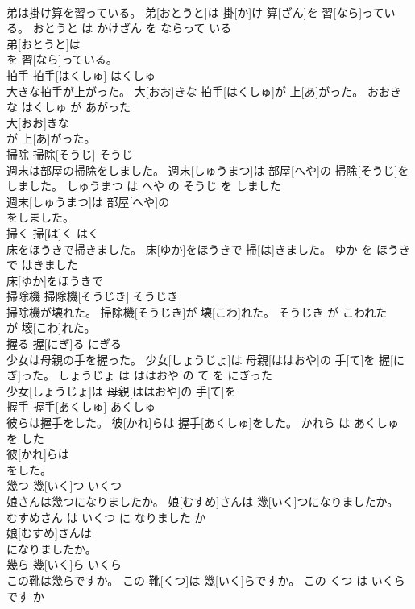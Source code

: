 \documentclass[8pt]{extreport}
\begin{document}
\begin{CJK}{UTF8}{min}
\\	弟は掛け算を習っている。	弟[おとうと]は 掛[か]け 算[ざん]を 習[なら]っている。	おとうと は かけざん を ならって いる	
\\	弟[おとうと]は
\\	を 習[なら]っている。			
\\	拍手	拍手[はくしゅ]	はくしゅ	
\\	大きな拍手が上がった。	大[おお]きな 拍手[はくしゅ]が 上[あ]がった。	おおき な はくしゅ が あがった	
\\	大[おお]きな
\\	が 上[あ]がった。			
\\	掃除	掃除[そうじ]	そうじ	
\\	週末は部屋の掃除をしました。	週末[しゅうまつ]は 部屋[へや]の 掃除[そうじ]をしました。	しゅうまつ は へや の そうじ を しました	
\\	週末[しゅうまつ]は 部屋[へや]の
\\	をしました。			
\\	掃く	掃[は]く	はく	
\\	床をほうきで掃きました。	床[ゆか]をほうきで 掃[は]きました。	ゆか を ほうき で はきました	
\\	床[ゆか]をほうきで
\\	掃除機	掃除機[そうじき]	そうじき	
\\	掃除機が壊れた。	掃除機[そうじき]が 壊[こわ]れた。	そうじき が こわれた	
\\	が 壊[こわ]れた。			
\\	握る	握[にぎ]る	にぎる	
\\	少女は母親の手を握った。	少女[しょうじょ]は 母親[ははおや]の 手[て]を 握[にぎ]った。	しょうじょ は ははおや の て を にぎった	
\\	少女[しょうじょ]は 母親[ははおや]の 手[て]を
\\	握手	握手[あくしゅ]	あくしゅ	
\\	彼らは握手をした。	彼[かれ]らは 握手[あくしゅ]をした。	かれら は あくしゅ を した	
\\	彼[かれ]らは
\\	をした。			
\\	幾つ	幾[いく]つ	いくつ	
\\	娘さんは幾つになりましたか。	娘[むすめ]さんは 幾[いく]つになりましたか。	むすめさん は いくつ に なりました か	
\\	娘[むすめ]さんは
\\	になりましたか。			
\\	幾ら	幾[いく]ら	いくら	
\\	この靴は幾らですか。	この 靴[くつ]は 幾[いく]らですか。	この くつ は いくら です か	

\end{CJK}
\end{document}
